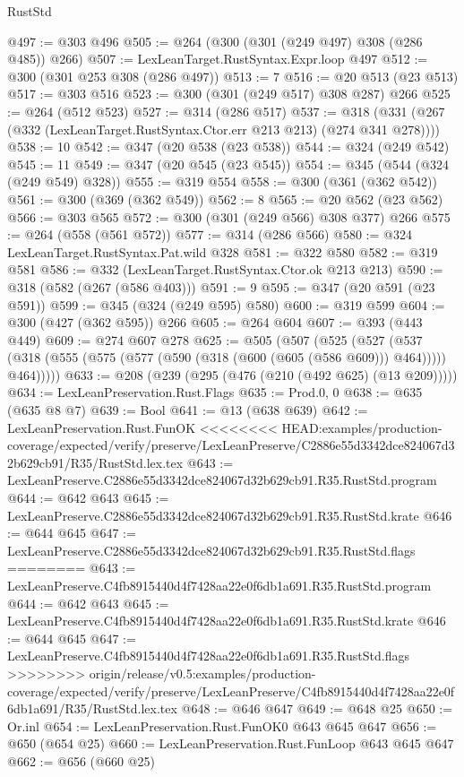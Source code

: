 \begin{lexlean}{RustStd}
\begin{coremodule}
{\begin{coremodule}
{{{{{{{@497 := @303 @496
@505 := @264 (@300 (@301 (@249 @497) @308 (@286 @485)) @266)
@507 := LexLeanTarget.RustSyntax.Expr.loop @497
@512 := @300 (@301 @253 @308 (@286 @497))
@513 := 7
@516 := @20 @513 (@23 @513)
@517 := @303 @516
@523 := @300 (@301 (@249 @517) @308 @287) @266
@525 := @264 (@512 @523)
@527 := @314 (@286 @517)
@537 := @318 (@331 (@267 (@332 (LexLeanTarget.RustSyntax.Ctor.err @213 @213) (@274 @341 @278))))
@538 := 10
@542 := @347 (@20 @538 (@23 @538))
@544 := @324 (@249 @542)
@545 := 11
@549 := @347 (@20 @545 (@23 @545))
@554 := @345 (@544 (@324 (@249 @549) @328))
@555 := @319 @554
@558 := @300 (@361 (@362 @542))
@561 := @300 (@369 (@362 @549))
@562 := 8
@565 := @20 @562 (@23 @562)
@566 := @303 @565
@572 := @300 (@301 (@249 @566) @308 @377) @266
@575 := @264 (@558 (@561 @572))
@577 := @314 (@286 @566)
@580 := @324 LexLeanTarget.RustSyntax.Pat.wild @328
@581 := @322 @580
@582 := @319 @581
@586 := @332 (LexLeanTarget.RustSyntax.Ctor.ok @213 @213)
@590 := @318 (@582 (@267 (@586 @403)))
@591 := 9
@595 := @347 (@20 @591 (@23 @591))
@599 := @345 (@324 (@249 @595) @580)
@600 := @319 @599
@604 := @300 (@427 (@362 @595)) @266
@605 := @264 @604
@607 := @393 (@443 @449)
@609 := @274 @607 @278
@625 := @505
    (@507
      (@525
        (@527
          (@537 (@318 (@555 (@575 (@577 (@590 (@318 (@600 (@605 (@586 @609))) @464))))) @464)))))
@633 := @208 (@239 (@295 (@476 (@210 (@492 @625) (@13 @209)))))
@634 := LexLeanPreservation.Rust.Flags
@635 := Prod.{0, 0}
@638 := @635 (@635 @8 @7)
@639 := Bool
@641 := @13 (@638 @639)
@642 := LexLeanPreservation.Rust.FunOK
<<<<<<<< HEAD:examples/production-coverage/expected/verify/preserve/LexLeanPreserve/C2886e55d3342dce824067d32b629cb91/R35/RustStd.lex.tex
@643 := LexLeanPreserve.C2886e55d3342dce824067d32b629cb91.R35.RustStd.program
@644 := @642 @643
@645 := LexLeanPreserve.C2886e55d3342dce824067d32b629cb91.R35.RustStd.krate
@646 := @644 @645
@647 := LexLeanPreserve.C2886e55d3342dce824067d32b629cb91.R35.RustStd.flags
========
@643 := LexLeanPreserve.C4fb8915440d4f7428aa22e0f6db1a691.R35.RustStd.program
@644 := @642 @643
@645 := LexLeanPreserve.C4fb8915440d4f7428aa22e0f6db1a691.R35.RustStd.krate
@646 := @644 @645
@647 := LexLeanPreserve.C4fb8915440d4f7428aa22e0f6db1a691.R35.RustStd.flags
>>>>>>>> origin/release/v0.5:examples/production-coverage/expected/verify/preserve/LexLeanPreserve/C4fb8915440d4f7428aa22e0f6db1a691/R35/RustStd.lex.tex
@648 := @646 @647
@649 := @648 @25
@650 := Or.inl
@654 := LexLeanPreservation.Rust.FunOK0 @643 @645 @647
@656 := @650 (@654 @25)
@660 := LexLeanPreservation.Rust.FunLoop @643 @645 @647
@662 := @656 (@660 @25)
}}}}}}}
\end{coremodule}}
\end{coremodule}
\end{lexlean}
